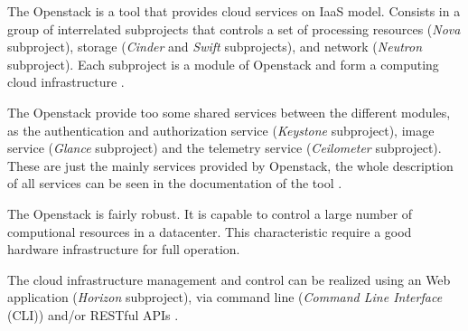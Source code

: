 \documentclass[conference]{IEEEtran}
\begin{document}
The Openstack is a tool that provides cloud services on IaaS model. Consists in a group of interrelated subprojects that controls a set of processing resources (\textit{Nova} subproject), storage (\textit{Cinder} and \textit{Swift} subprojects), and network (\textit{Neutron} subproject). Each subproject is a module of Openstack and form a computing cloud infrastructure \cite{openstack} \cite{bui2016}.


The Openstack provide too some shared services between the different modules, as the authentication and
authorization service (\textit{Keystone} subproject), image service (\textit{Glance} subproject) and the
telemetry service (\textit{Ceilometer} subproject). These are just the mainly services provided by Openstack,
the whole description of all services can be seen in the documentation of the tool \cite{openstack}.


The Openstack is fairly robust. It is capable to control a large number of computional resources
in a datacenter. This characteristic require a good hardware infrastructure for full operation.


The cloud infrastructure management and control can be realized using an Web application (\textit{Horizon} subproject), via command line (\textit{Command Line Interface} (CLI)) and/or RESTful APIs \cite{bui2016} \cite{openstack}. 
\end{document}
